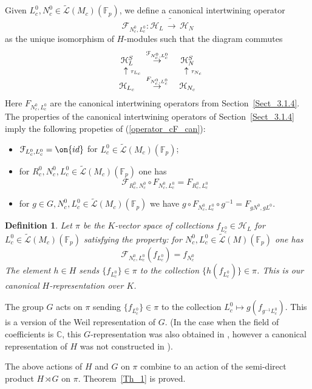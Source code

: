 \documentclass[11pt]{amsart}
\newtheorem{Def}[subsubsection]{Definition}
\theoremstyle{definition}
\theoremstyle{remark}
\newcommand{\cH}{{\mathcal H}}
\newcommand{\cL}{{\mathcal L}}
\newcommand{\cF}{{\mathcal F}}
\newcommand{\CC}{{\mathbb C}}
\newcommand{\toup}[1]{\stackrel{#1}{\to}}
\newcommand{\id}{\on{id}}
\newcommand{\Fp}{\mathbb{F}_p}  %
\newcommand{\iso}{{\widetilde\to}}
\newcommand{\comp}{\circ}
\newcommand{\wt}{\widetilde}
\newcommand{\<}{\langle}
\renewcommand{\>}{\rangle}
\begin{document}
\sssec{} Given $L_c^0, N_c^0\in \wt\cL(M_c)(\Fp)$, we define a canonical intertwining operator 
\begin{equation}
\label{operator_cF_can}
\cF_{N_c^0, L_c^0}: \cH_L\,\iso\,\cH_N
\end{equation}
as the unique isomorphism of $H$-modules such that the diagram commutes
$$
\begin{array}{ccc}
\cH_L^S & \;\toup{\cF_{N_c^0, L_c^0}}\; &\cH_N^S\\
\uparrow\lefteqn{\scriptstyle \tau_{L_c}} && \uparrow\lefteqn{\scriptstyle \tau_{N_c}} \\
\cH_{L_c} & \;\toup{F_{N_c^0, L_c^0}}\; & \cH_{N_c}
\end{array}
$$
Here $F_{N_c^0, L_c^0}$ are the canonical intertwining operators from Section~\ref{Sect_3.1.4}. The properties of the canonical intertwining operators of Section~\ref{Sect_3.1.4} imply the following propeties of (\ref{operator_cF_can}): 

\begin{itemize}
\item $\cF_{L_c^0, L_c^0}=\id$ for $L_c^0\in \wt\cL(M_c)(\Fp)$;
\item for $R_c^0, N_c^0, L_c^0\in \wt\cL(M_c)(\Fp)$ one has
$$
\cF_{R_c^0, N_c^0}\comp F_{N_c^0, L_c^0}=F_{R_c^0, L_c^0}
$$
\item for $g\in G, N_c^0, L_c^0\in \wt\cL(M_c)(\Fp)$ we have $g\comp F_{N_c^0, L_c^0}\comp g^{-1}=F_{gN^0, gL^0}$.
\end{itemize}

\begin{Def} Let $\pi$ be the $K$-vector space of collections $f_{L_c^0}\in \cH_L$ for $L_c^0\in \wt\cL(M_c)(\Fp)$ satisfying the property: for $N_c^0, L_c^0\in \wt\cL(M)(\Fp)$ one has
$$
\cF_{N_c^0, L_c^0}(f_{L_c^0})=f_{N_c^0}
$$
The element $h\in H$ sends $\{f_{L_c^0}\}\in\pi$ to the collection $\{h(f_{L_c^0})\}\in\pi$. This is our canonical $H$-representation over $K$.
\end{Def}

 The group $G$ acts on $\pi$ sending $\{f_{L_c^0}\}\in\pi$ to the collection $L_c^0\mapsto  g(f_{g^{-1}L_c^0})$. This is a version of the Weil representation of $G$. (In the case when the field of coefficients is $\CC$, this $G$-representation was also obtained in \cite{CMS}, however a canonical representation of $H$ was not constructed in \cite{CMS}). 
 
 The above actions of $H$ and $G$ on $\pi$ combine to an action of the semi-direct product $H\rtimes G$ on $\pi$. Theorem~\ref{Th_1} is proved.
 
\end{document}
